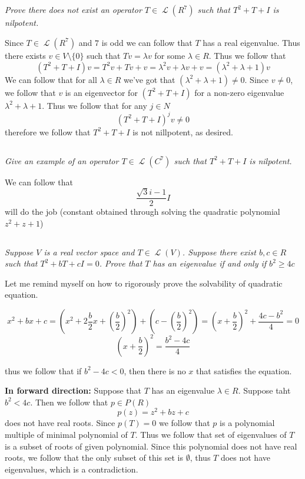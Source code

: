 \documentclass[11pt,oneside,titlepage]{book}
\DeclareMathOperator \map {\mathcal {L}}
\begin{document}
\subsection{}

\textit{Prove there does not exist an operator $T \in \map(R^7)$ such that
  $T^2 + T + I$ is nilpotent.}

Since $T \in \map(R^7)$ and $7$ is odd we can follow that $T$ has a real eigenvalue.
Thus there exists $v \in V \setminus \{0\}$ such that $Tv = \lambda v$ for some $\lambda \in R$.
Thus we follow that
$$(T^2 + T + I)v = T^2 v + Tv + v = \lambda^2 v + \lambda v + v = (\lambda^2 + \lambda + 1) v$$
We can follow that for all $\lambda \in R$ we've got that $(\lambda^2 + \lambda + 1) \neq 0$.
Since $v \neq 0$, we follow that $v$ is an eigenvector for $(T^2 + T + I)$ for a non-zero
eigenvalue $\lambda^2 + \lambda + 1$. Thus we follow that for any $j \in N$
$$(T^2 + T + I)^j v \neq 0$$
therefore we follow that $T^2 + T + I$ is not nillpotent, as desired.

\subsection{}

\textit{Give an example of an operator $T \in \map(C^7)$ such that $T^2 + T + I$
  is nilpotent.}

We can follow that
$$\frac{\sqrt{3} i - 1}{2} I$$
will do the job (constant obtained through solving the quadratic polynomial $z^2 + z + 1$)

\subsection{}

\textit{Suppose $V$ is a real vector space and $T \in \map(V)$. Suppose there exist
  $b, c \in R$ such that $T^2 + bT + cI = 0$. Prove that $T$ has an eigenvalue
  if and only if $b^2 \geq 4c$}

Let me remind myself on how to rigorously prove the solvability of quadratic equation.

$$x^2 + bx + c = (x^2 + 2 \frac{b}{2} x + (\frac{b}{2})^2 ) + 
(c - (\frac{b}{2})^2) = (x + \frac{b}{2})^2 + \frac{4c - b^2}{4} = 0$$
$$(x + \frac{b}{2})^2 = \frac{b^2 - 4c}{4}$$

thus we follow that if $b^2 - 4c < 0$, then there is no $x$ that satisfies the equation.

\textbf{In forward direction: }
Suppose that $T$ has an eigenvalue $\lambda \in R$. Suppose taht $b^2 < 4c$. Then we follow that
$p \in P(R)$
$$p(z) = z^2 + bz + c$$
does not have real roots. Since $p(T) = 0$ we follow that $p$ is a polynomial multiple of
minimal polynomial of $T$. Thus we follow that set of eigenvalues of $T$ is a subset of
roots of given polynomial. Since this polynomial does not have real roots, we follow that
the only subset of this set is $\emptyset$, thus $T$ does not have eigenvalues, which is a
contradiction.
\end{document}
